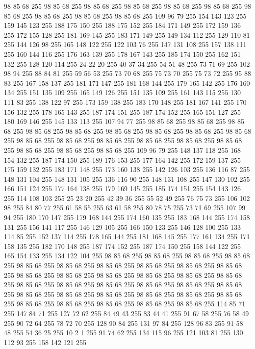 98 85 68 255 98 85 68 255 98 85 68 255 98 85 68 255 98 85 68 255 98 85 68 255 98 85 68 255 98 85 68 255 98 85 68 255 98 85 68 255 109 96 79 255 154 143 123 255 159 145 123 255 188 175 150 255 188 175 152 255 184 171 149 255 172 159 136 255 172 155 128 255 181 169 145 255 183 171 149 255 149 134 112 255 129 110 81 255 144 126 98 255 165 148 122 255 122 103 76 255 147 131 108 255 157 138 111 255 160 144 116 255 176 163 139 255 178 167 143 255 185 174 150 255 162 151 132 255 128 120 114 255 24 22 20 255 40 37 34 255 54 51 48 255 73 71 69 255 102 98 94 255 88 84 81 255 59 56 53 255 73 70 68 255 75 73 70 255 75 73 72 255 95 88 83 255 167 158 137 255 181 171 147 255 181 168 144 255 179 165 142 255 176 160 134 255 151 135 109 255 165 149 126 255 151 135 109 255 161 143 115 255 130 111 83 255 138 122 97 255 173 159 138 255 183 170 148 255 181 167 141 255 170 156 132 255 178 165 143 255 187 174 151 255 187 174 152 255 165 151 127 255 180 169 146 255
145 133 113 255 107 94 77 255 98 85 68 255 98 85 68 255 98 85 68 255 98 85 68 255 98 85 68 255 98 85 68 255 98 85 68 255 98 85 68 255 98 85 68 255 98 85 68 255 98 85 68 255 98 85 68 255 98 85 68 255 98 85 68 255 98 85 68 255 98 85 68 255 98 85 68 255 98 85 68 255 109 96 79 255 148 137 118 255 168 154 132 255 187 174 150 255 189 176 153 255 177 164 142 255 172 159 137 255 175 159 132 255 183 171 148 255 173 160 138 255 142 126 103 255 136 116 87 255 148 131 104 255 148 131 105 255 136 116 90 255 148 131 108 255 147 130 102 255 166 151 124 255 177 164 138 255 179 169 145 255 185 174 151 255 154 143 126 255 114 108 103 255 25 23 20 255 42 39 36 255 55 52 49 255 76 75 73 255 106 102 98 255 84 80 77 255 61 58 55 255 63 61 58 255 80 78 75 255 73 71 69 255 107 99 94 255 180 170 147 255 179 168 144 255 174 160 135 255 183 168 144 255 174 158 131 255 156 141 117 255 146 129 105 255 166 150 123 255 146 128 100 255 133 114 85 255
152 137 114 255 178 165 144 255 181 168 145 255 177 161 134 255 171 158 135 255 182 170 148 255 187 174 152 255 187 174 150 255 158 144 122 255 165 154 133 255 134 122 104 255 98 85 68 255 98 85 68 255 98 85 68 255 98 85 68 255 98 85 68 255 98 85 68 255 98 85 68 255 98 85 68 255 98 85 68 255 98 85 68 255 98 85 68 255 98 85 68 255 98 85 68 255 98 85 68 255 98 85 68 255 98 85 68 255 98 85 68 255 98 85 68 255 98 85 68 255 98 85 68 255 98 85 68 255 98 85 68 255 98 85 68 255 98 85 68 255 98 85 68 255 98 85 68 255 98 85 68 255 98 85 68 255 98 85 68 255 98 85 68 255 98 85 68 255 98 85 68 255 98 85 68 255 114 85 71 255 147 84 71 255 127 72 62 255 84 49 43 255 83 44 41 255 91 67 58 255 76 58 49 255 90 72 64 255 78 72 70 255 128 90 84 255 131 97 84 255 128 96 83 255 91 58 48 255 54 36 25 255 10 2 1 255 91 74 62 255 134 115 96 255 121 103 81 255 130 112 93 255 158 142 121 255
